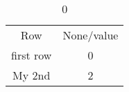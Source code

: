 \begin{table}
	\caption{0}
	\label{tab:test}
	\begin{tabular}{cc}
		Row	&	None/value	\\
		first row	&	0	\\
		My 2nd	&	2	\\
	\end{tabular}
\end{table}
